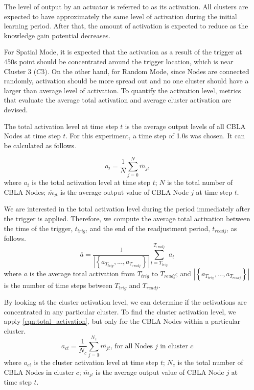 The level of output by an actuator is referred to as its activation. All clusters are expected to have approximately the same level of activation during the initial learning period. After that, the amount of activation is expected to reduce as the knowledge gain potential decreases. 

For Spatial Mode, it is expected that the activation as a result of the trigger at 450s point should be concentrated around the trigger location, which is near Cluster 3 ($C3$). On the other hand, for Random Mode, since Nodes are connected randomly, activation should be more spread out and no one cluster should have a larger than average level of activation. To quantify the activation level, metrics that evaluate the average total activation and average cluster activation are devised.

The total activation level at time step $t$ is the average output levels of all CBLA Nodes at time step $t$. For this experiment, a time step of 1.0s was chosen. It can be calculated as follows.
 
\begin{equation}\label{eqn:total_activation}
	a_t = \frac{1}{N} \sum_{j=0}^{N} \overline{m}_{jt}
\end{equation}
where $a_t$ is the total activation level at time step $t$; $N$ is the total number of CBLA Nodes; $\overline{m}_{jt}$ is the average output value of CBLA Node $j$ at time step $t$.

We are interested in the total activation level during the period immediately after the trigger is applied. Therefore, we compute the average total activation between the time of the trigger, $t_{trig}$, and the end of the readjustment period, $t_{readj}$, as follows.
\begin{equation}\label{eqn:average_total_activation}
\overline{a} = \frac{1}{| \left\{ a_{T_{trig}}, ... , a_{T_{readj}} \right\}|} \sum_{t=T_{trig}}^{T_{readj}} a_{t}
\end{equation}
where $\overline{a}$ is the average total activation from $T_{trig}$ to $T_{readj}$; and $| \left\{ a_{T_{trig}}, ..., a_{T_{readj}} \right\}|$ is the number of time steps between $T_{trig}$ and $T_{readj}$.

By looking at the cluster activation level, we can determine if the activations are concentrated in any particular cluster. 
To find the cluster activation level, we apply \eqref{eqn:total_activation}, but only for the CBLA Nodes within a particular cluster.
\begin{equation}\label{eqn:cluster_activation}
	a_{ct} = \frac{1}{N_c} \sum_{j=0}^{N_c} \overline{m_{jt}} \text{, for all Nodes $j$ in cluster $c$}
\end{equation}
where $a_{ct}$ is the cluster activation level at time step $t$; $N_c$ is the total number of CBLA Nodes in cluster $c$; $\overline{m}_{jt}$ is the average output value of CBLA Node $j$ at time step $t$.

